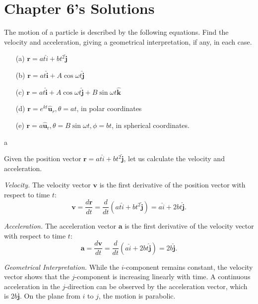 \section{Chapter 6's Solutions}

\begin{problem}{6.4}
	The motion of a particle is described by the following equations. Find the velocity and acceleration, giving a geometrical interpretation, if any, in each case.
	\begin{enumerate}
		\item[(a)] \(\mathbf{r}=a t \hat{i}+b t^2 \hat{\mathbf{j}}\)
		\item[(b)] \(\mathbf{r}=a t \hat{\mathbf{i}}+A \cos \omega t \hat{\mathbf{j}}\)
		\item[(c)] \(\mathbf{r}=a t \hat{\mathbf{i}}+A \cos \omega t \hat{\mathbf{j}}+B \sin \omega t \hat{\mathbf{k}}\)
		\item[(d)] \(\mathbf{r}=e^{k t} \hat{\mathbf{u}}_r, \theta=a t\), in polar coordinates
		\item[(e)] \(\mathbf{r}=a \hat{\mathbf{u}}_{\mathrm{r}}, \theta=B \sin \omega t, \phi=b t\), in spherical coordinates.
	\end{enumerate}
\end{problem}

\begin{solution}{6.4}{a}
	
	Given the position vector \(\mathbf{r} = a t \hat{i} + b t^2 \hat{\mathbf{j}}\), let us calculate the velocity and acceleration.
	
	\textit{Velocity.}
	The velocity vector \(\mathbf{v}\) is the first derivative of the position vector with respect to time \(t\):
	\[
	\mathbf{v} = \frac{d\mathbf{r}}{dt} = \frac{d}{dt}(a t \hat{i} + b t^2 \hat{\mathbf{j}}) = a \hat{i} + 2bt \hat{\mathbf{j}}.
	\]
	
	\textit{Acceleration.}
	The acceleration vector \(\mathbf{a}\) is the first derivative of the velocity vector with respect to time \(t\):
	\[
	\mathbf{a} = \frac{d\mathbf{v}}{dt} = \frac{d}{dt}(a \hat{i} + 2bt \hat{\mathbf{j}}) = 2b \hat{\mathbf{j}}.
	\]
	
	\textit{Geometrical Interpretation.}
	While the \(i\)-component remains constant, the velocity vector shows that the \(j\)-component is increasing linearly with time. A continuous acceleration in the \(j\)-direction can be observed by the acceleration vector, which is \(2b \hat{\mathbf{j}}\). On the plane from \(i\) to \(j\), the motion is parabolic.

\end{solution}

